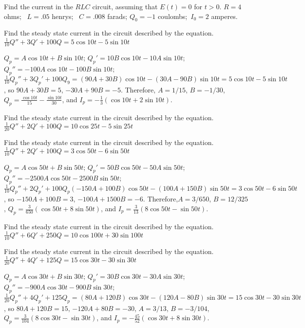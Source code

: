 \documentclass{ximera}
\begin{document}
\begin{problem}\label{exer:6.3.5}
Find the current in the
$RLC$ circuit, assuming that $E(t)=0$ for $t>0$.  $R=4$ ohms;  \, $L=.05$ henrys;  \, $C=.008$ farads;   $Q_0=-1$
coulombs;  \,$I_0=2$ amperes.
\end{problem}

\begin{problem}\label{exer:6.3.6}
Find the steady
state current in the circuit described by the  equation.
$\frac{1}{10}Q''+3Q'+100Q=5\cos10t-5\sin10t$

\begin{solution}
    $Q_p=A\cos10t+B\sin10t$;
$Q_p'=10B\cos10t-10A\sin10t$;
$Q_p''=-100A\cos10t-100B\sin10t$;
$\frac{1}{10}Q_p''+3Q_p'+100Q_9=
(90A+30B)\cos10t-(30A-90B)\sin10t=5\cos10t-5\sin10t$,
so $90A+30B=5$, $-30A+90B=-5$. Therefore, $A=1/15$, $B=-1/30$,
$Q_p=\frac{\cos10t}{15}-\frac{\sin10t}{30}$, and
$I_p=-\frac{1}{3}(\cos10t+2\sin10t)$.
\end{solution}
\end{problem}

\begin{problem}\label{exer:6.3.7}
Find the steady
state current in the circuit described by the  equation.
$\frac{1}{20}Q''+2Q'+100Q=10\cos25t-5\sin25t$
\end{problem}

\begin{problem}\label{exer:6.3.8}
Find the steady
state current in the circuit described by the  equation.
$\frac{1}{10}Q''+2Q'+100Q=3\cos50t-6\sin50t$

\begin{solution}
    $Q_p=A\cos 50t+B\sin 50t$;
$Q_p'=50B\cos 50t-50A\sin 50t$;
$Q_p''=-2500A\cos 50t-2500B\sin 50t$;
$\frac{1}{10}Q_p''+2Q_p'+100Q_p
(-150A+100B)\cos 50t-(100A+150B)\sin 50t=3\cos50t-6\sin50t$,
so $-150A+100B=3$, $-100A+1500B=-6$. Therefore,$A=3/650$,
$B=12/325$, $Q_p=\frac{3}{650}(\cos50t+8\sin50t)$, and
$I_p= \frac{3}{13}(8\cos50t-\sin50t)$.
\end{solution}
\end{problem}

\begin{problem}\label{exer:6.3.9}
Find the steady
state current in the circuit described by the  equation.
$\frac{1}{10}Q''+6Q'+250Q=10\cos100t+30\sin100t$
\end{problem}

\begin{problem}\label{exer:6.3.10}
Find the steady
state current in the circuit described by the  equation.
$\frac{1}{20}Q''+4Q'+125Q=15\cos30t-30\sin30t$

\begin{solution}
    $Q_p=A\cos 30t+B\sin 30t$;
$Q_p'=30B\cos 30t-30A\sin 30t$;
$Q_p''=-900A\cos 30t-900B\sin 30t$;
$\frac{1}{20}Q_p''+4Q_p'+125Q_p=
(80A+120B)\cos 30t-(120A-80B)\sin 30t=15\cos30t-30\sin30t$, so
$80A+120B=15$, $-120A+80B=-30$,
$A=3/13$, $B=-3/104$,
$Q_p=
\frac{3}{104}(8\cos 30t-\sin 30t)$, and
$I_p=-\frac{45}{52}(\cos30t+8\sin30t)$.
\end{solution}
\end{problem}
\end{document}
